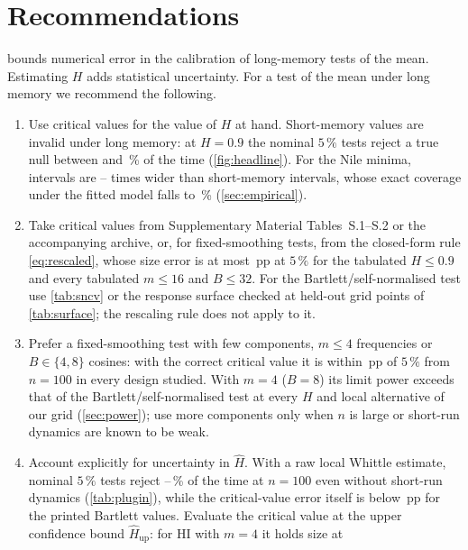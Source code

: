 \FloatBarrier
\section{Recommendations}\label{sec:conclusion}

\CosCert{} bounds numerical error in the calibration of long-memory tests of the mean. Estimating $H$ adds statistical
uncertainty. For a test of the mean under long memory we recommend the following.
\begin{enumerate}
\item Use critical values for the value of $H$ at hand. Short-memory values are invalid under long memory: at $H=0.9$
the nominal $5\,\%$ tests reject a true null between  and \,\% of the time
(\cref{fig:headline}). For the Nile minima, \CosCert{} intervals are -- times
wider than short-memory intervals, whose exact coverage under the fitted model falls to \,\%
(\cref{sec:empirical}).
\item Take critical values from Supplementary Material Tables~S.1--S.2 or the accompanying archive, or, for
fixed-smoothing tests, from the closed-form rule \eqref{eq:rescaled}, whose size error is at most
\,pp at $5\,\%$ for the tabulated $H\le0.9$ and every tabulated $m\le16$ and $B\le32$. For the
Bartlett/self-normalised test use \cref{tab:sncv} or the response surface checked at held-out grid points of \cref{tab:surface}; the rescaling
rule does not apply to it.
\item Prefer a fixed-smoothing test with few components, $m\le4$ frequencies or $B\in\{4,8\}$ cosines: with the
correct critical value it is within \,pp of $5\,\%$ from $n=100$ in every design studied. With
$m=4$ ($B=8$) its limit power exceeds that of the Bartlett/self-normalised test at every $H$ and local alternative of
our grid (\cref{sec:power}); use more components only when $n$ is large or short-run dynamics are known to be weak.
\item Account explicitly for uncertainty in $\hat H$. With a raw local Whittle estimate, nominal $5\,\%$ tests reject
--\,\% of the time at $n=100$ even without short-run dynamics
(\cref{tab:plugin}), while the critical-value error itself is below \,pp for the printed Bartlett
values. Evaluate the critical value at the upper confidence bound $\hat H_{\mathrm{up}}$: for HI with $m=4$ it holds size at

\end{enumerate}
